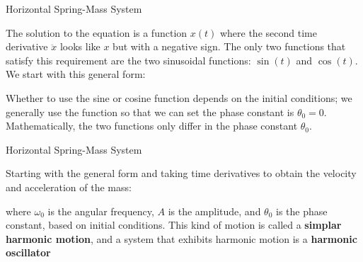 \documentclass[12pt,compress,aspectratio=169]{beamer}
\begin{document}
\begin{frame}{Horizontal Spring-Mass System}


  The solution to the equation is a function $x(t)$ where the second time
  derivative $\ddot x$ looks like $x$ but with a negative sign. The only two
  functions that satisfy this requirement are the two sinusoidal functions:
  $\sin(t)$ and $\cos(t)$. We start with this general form:
    
  
  \vspace{-.15in}Whether to use the sine or cosine function depends on the
  initial conditions; we generally use the function so that we can set the
  phase constant is $\theta_0=0$. Mathematically, the two functions only differ
  in the phase constant $\theta_0$.
\end{frame}



\begin{frame}{Horizontal Spring-Mass System}

  
  Starting with the general form and taking time derivatives to obtain the
  velocity and acceleration of the mass:
 
  \vspace{-.2in}{\large
    \begin{align*}
      x(t)&=A\cos(\omega_0 t-\theta_0)\\
      v(t)&=-A\omega_0\sin(\omega_0 t-\theta_0)\\
      a(t)&=-A\omega_0^2\cos(\omega_0 t-\theta_0)=-\omega_0^2x
    \end{align*}
  }
  
  \vspace{.05in}where $\omega_0$ is the angular frequency, $A$ is the
  amplitude, and $\theta_0$ is the phase constant, based on initial conditions.
  This kind of motion is called a \textbf{simplar harmonic motion}, and a
  system that exhibits harmonic motion is a \textbf{harmonic oscillator}
\end{frame}
\end{document}
